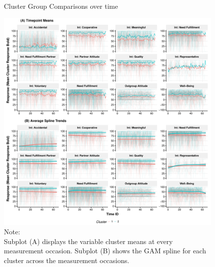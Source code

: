 \begin{figure}[!ht] %
  \caption{Cluster Group Comparisons over time}
  \label{fig:clusterTs}
  \centering\includegraphics[width=\textwidth]{figures/clusterTsComb.pdf}
  \caption*{Note: \\
  Subplot (A) displays the variable cluster means at every measurement occasion. Subplot (B) shows the GAM spline for each cluster across the measurement occasions.}
\end{figure}
